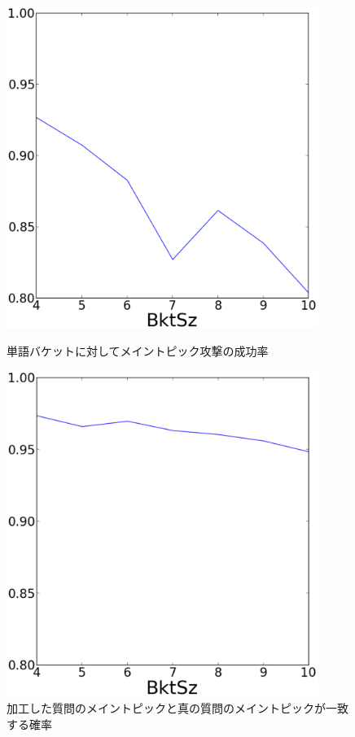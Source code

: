 \documentclass[master]{suribt}
\theoremstyle{definition}
\begin{document}
 \begin{figure}
 \begin{minipage}[t]{0.5\linewidth}
 \centering
 \includegraphics[width=0.9\textwidth]{a1.eps}
 \caption{単語バケットに対してメイントピック攻撃の成功率}
 \label{fig:mt1}
 \end{minipage}%
 \begin{minipage}[t]{0.5\linewidth}
 \centering
 \includegraphics[width=0.9\textwidth]{a2.eps}
 \caption{加工した質問のメイントピックと真の質問のメイントピックが一致する確率}
 \label{fig:mt2}
 \end{minipage}
 \end{figure}
 
\end{document}
